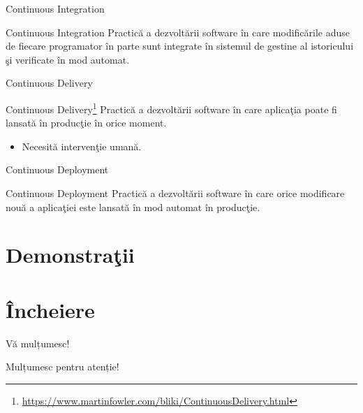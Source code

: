 \documentclass[presentation]{beamer}
\begin{document}
\begin{frame}[label={sec:org642f1b7}]{Continuous Integration}
\begin{block}{Continuous Integration}
\vskip 0.1in
Practică a dezvoltării software în care modificările aduse de fiecare programator în parte sunt integrate în sistemul de gestine al istoricului şi verificate în mod automat.
\end{block}
\end{frame}
\begin{frame}[label={sec:org90c4de1}]{Continuous Delivery}
\begin{block}{Continuous Delivery\footnote{\url{https://www.martinfowler.com/bliki/ContinuousDelivery.html}}}
\vskip 0.1in
Practică a dezvoltării software în care aplicaţia poate fi lansată în producţie în orice moment.
\begin{itemize}
\item Necesită intervenţie umană.
\end{itemize}
\end{block}
\end{frame}
\begin{frame}[label={sec:org81f630f}]{Continuous Deployment}
\begin{block}{Continuous Deployment}
\vskip 0.1in
Practică a dezvoltării software în care orice modificare nouă a aplicaţiei este lansată în mod automat în producţie.
\end{block}
\end{frame}
\section{Demonstraţii}
\label{sec:org2784a19}
\section{Încheiere}
\label{sec:orge85ad0c}
\begin{frame}[label={sec:orgd01f5c0}]{Vă mulțumesc!}
\begin{center}
Mulțumesc pentru atenție!
\end{center}
\end{frame}
\end{document}
